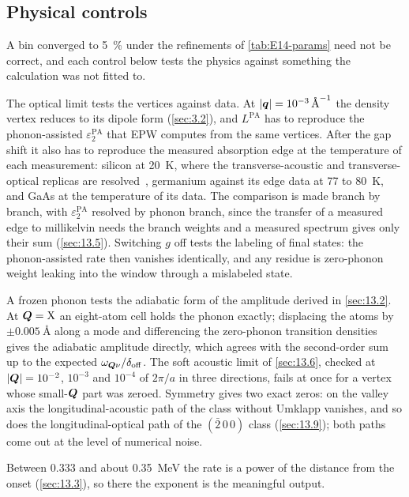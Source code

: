 \subsection{Physical controls}

A bin converged to \SI{5}{\percent} under the refinements of \cref{tab:E14-params} need not be correct, and each control below tests the physics against something the calculation was not fitted to.

The optical limit tests the vertices against data. At $|\bm{q}| = \SI{e-3}{\angstrom^{-1}}$ the density vertex reduces to its dipole form (\cref{sec:3.2}), and $L^{\mathrm{PA}}$ has to reproduce the phonon-assisted $\varepsilon_2^{\mathrm{PA}}$ that EPW computes from the same vertices. After the gap shift it also has to reproduce the measured absorption edge at the temperature of each measurement: silicon at \SI{20}{K}, where the transverse-acoustic and transverse-optical replicas are resolved~\cite{macfarlane1958fine}, germanium against its edge data at 77 to \SI{80}{K}, and GaAs at the temperature of its data. The comparison is made branch by branch, with $\varepsilon_2^{\mathrm{PA}}$ resolved by phonon branch, since the transfer of a measured edge to millikelvin needs the branch weights and a measured spectrum gives only their sum (\cref{sec:13.5}). Switching $g$ off tests the labeling of final states: the phonon-assisted rate then vanishes identically, and any residue is zero-phonon weight leaking into the window through a mislabeled state.

A frozen phonon tests the adiabatic form of the amplitude derived in \cref{sec:13.2}. At $\bm{Q} = \mathrm{X}$ an eight-atom cell holds the phonon exactly; displacing the atoms by $\pm\SI{0.005}{\angstrom}$ along a mode and differencing the zero-phonon transition densities gives the adiabatic amplitude directly, which agrees with the second-order sum up to the expected $\omega_{\bm{Q}\nu}/\delta_{\mathrm{off}}$. The soft acoustic limit of \cref{sec:13.6}, checked at $|\bm{Q}| = 10^{-2}$, $10^{-3}$ and $10^{-4}$ of $2\pi/a$ in three directions, fails at once for a vertex whose small-$\bm{Q}$ part was zeroed. Symmetry gives two exact zeros: on the valley axis the longitudinal-acoustic path of the class without Umklapp vanishes, and so does the longitudinal-optical path of the $(\bar2\,0\,0)$ class (\cref{sec:13.9}); both paths come out at the level of numerical noise.

Between 0.333 and about \SI{0.35}{MeV} the rate is a power of the distance from the onset (\cref{sec:13.3}), so there the exponent is the meaningful output.

